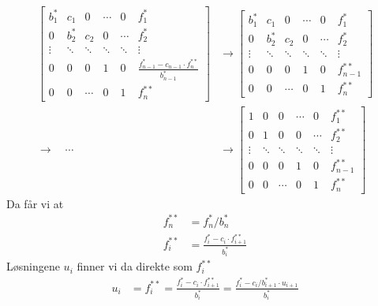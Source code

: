 \documentclass[a4paper,10pt,norsk]{article}
\begin{document}
\begin{align*}
\begin{bmatrix}
 b_1^*   &  c_1    &   0       &  \cdots  & 0        &  f_1^* \\[0.5em]
 0      &  b_2^*   &   c_2     & 0        &  \cdots  &  f_2^* \\ 
 \vdots &  \ddots  &  \ddots   & \ddots   &   \ddots & \vdots \\[0.7em]  
 0       &  0      &    0      &  1       &   0      & \frac{f_{n-1}^*-c_{n-1} \cdot f_n^{**}}{b_{n-1}^*} \\[0.7em]
 0       &  0      & \cdots    &  0       &   1      &  f_n^{**}
\end{bmatrix}&\rightarrow
\begin{bmatrix}
 b_1^*   &  c_1    &   0     &  \cdots  &   0      &  f_1^* \\[0.5em]
 0      &  b_2^*   &   c_2   & 0        &  \cdots  &  f_2^* \\ 
 \vdots &  \ddots  &  \ddots & \ddots   &   \ddots & \vdots \\[0.7em]  
 0       &  0      &    0    &  1       &   0      & f_{n-1}^{**} \\[0.7em]
 0       &  0      & \cdots  &  0       &   1      &  f_n^{**}
\end{bmatrix}\\
\rightarrow  \quad\cdots\quad & \rightarrow
\begin{bmatrix}
 1      &  0      &   0     &  \cdots  &  0      & f_1^{**} \\[0.5em]
 0      &  1      &   0     &  0       & \cdots  & f_2^{**} \\ 
 \vdots &  \ddots &  \ddots &  \ddots  &  \ddots & \vdots \\[0.7em]  
 0      &  0      &    0    &   1      &  0      & f_{n-1}^{**} \\[0.7em]
 0      &  0      & \cdots  &  0       &  1      & f_n^{**}
\end{bmatrix}
\end{align*}
Da får vi at
\begin{align*}
f^{**}_n&=f_n^*/b_n^*\\
f^{**}_i&= \frac{f_{i}^* -c_{i} \cdot f_{i+1}^{**}}{b_i^* }
\end{align*}
Løsningene $u_i$ finner vi da direkte som $f^{**}_i$
\begin{align*}
u_i&=f^{**}_i =\frac{f_{i}^* -c_{i} \cdot f_{i+1}^{**}}{b_i^* } =\frac{f_{i}^* -c_{i}/b_{i+1}^* \cdot u_{i+1}}{b_i^*}\\
\end{align*}
\end{document}
